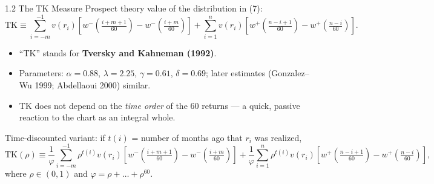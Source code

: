 \documentclass[aspectratio=169, 11pt]{beamer}
\begin{document}
\begin{frame}{1.2 The TK Measure}
Prospect theory value of the distribution in (7):
\begin{equation}
\mathrm{TK}\equiv
\sum_{i=-m}^{-1} v(r_i)\left[w^{-}\!\left(\tfrac{i+m+1}{60}\right)-w^{-}\!\left(\tfrac{i+m}{60}\right)\right]
+\sum_{i=1}^{n} v(r_i)\left[w^{+}\!\left(\tfrac{n-i+1}{60}\right)-w^{+}\!\left(\tfrac{n-i}{60}\right)\right].
\tag{8}
\end{equation}
\vspace{0.3em}
\begin{itemize}
  \item ``TK'' stands for \textbf{Tversky and Kahneman (1992)}.
  \item Parameters: $\alpha=0.88$, $\lambda=2.25$, $\gamma=0.61$, $\delta=0.69$; later estimates (Gonzalez--Wu 1999; Abdellaoui 2000) similar.
  \item TK does not depend on the \emph{time order} of the 60 returns --- a quick, passive reaction to the chart as an integral whole.
\end{itemize}
\vspace{0.3em}
Time-discounted variant: if $t(i)$ = number of months ago that $r_i$ was realized,
\begin{equation}
\mathrm{TK}(\rho)\equiv
\frac{1}{\varphi}\sum_{i=-m}^{-1} \rho^{t(i)} v(r_i)\left[w^{-}\!\left(\tfrac{i+m+1}{60}\right)-w^{-}\!\left(\tfrac{i+m}{60}\right)\right]
+\frac{1}{\varphi}\sum_{i=1}^{n} \rho^{t(i)} v(r_i)\left[w^{+}\!\left(\tfrac{n-i+1}{60}\right)-w^{+}\!\left(\tfrac{n-i}{60}\right)\right],
\tag{9}
\end{equation}
where $\rho\in(0,1)$ and $\varphi=\rho+\ldots+\rho^{60}$.
\end{frame}
\end{document}
